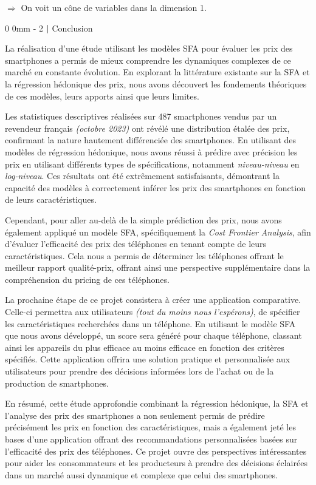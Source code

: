 \documentclass[
  12pt,
]{report}
\makeatletter
\renewcommand{\chapter}{%
    \clearpage %
    \@startsection{chapter}%
    {0} %
    {0mm} %
    {-\baselineskip} %
    {2\baselineskip} %
    {\normalfont\Huge\bfseries | \Huge\bfseries}%
}
\makeatother
\begin{document}
\(\Rightarrow\) On voit un cône de variables dans la dimension 1.

\chapter{Conclusion}\label{conclusion-2}

La réalisation d'une étude utilisant les modèles SFA pour évaluer les
prix des smartphones a permis de mieux comprendre les dynamiques
complexes de ce marché en constante évolution. En explorant la
littérature existante sur la SFA et la régression hédonique des prix,
nous avons découvert les fondements théoriques de ces modèles, leurs
apports ainsi que leurs limites.

Les statistiques descriptives réalisées sur 487 smartphones vendus par
un revendeur français \emph{(octobre 2023)} ont révélé une distribution
étalée des prix, confirmant la nature hautement différenciée des
smartphones. En utilisant des modèles de régression hédonique, nous
avons réussi à prédire avec précision les prix en utilisant différents
types de spécifications, notamment \emph{niveau-niveau} en
\emph{log-niveau}. Ces résultats ont été extrêmement satisfaisants,
démontrant la capacité des modèles à correctement inférer les prix des
smartphones en fonction de leurs caractéristiques.

Cependant, pour aller au-delà de la simple prédiction des prix, nous
avons également appliqué un modèle SFA, spécifiquement la \emph{Cost
Frontier Analysis}, afin d'évaluer l'efficacité des prix des téléphones
en tenant compte de leurs caractéristiques. Cela nous a permis de
déterminer les téléphones offrant le meilleur rapport qualité-prix,
offrant ainsi une perspective supplémentaire dans la compréhension du
pricing de ces téléphones.

La prochaine étape de ce projet consistera à créer une application
comparative. Celle-ci permettra aux utilisateurs \emph{(tout du moins
nous l'espérons)}, de spécifier les caractéristiques recherchées dans un
téléphone. En utilisant le modèle SFA que nous avons développé, un score
sera généré pour chaque téléphone, classant ainsi les appareils du plus
efficace au moins efficace en fonction des critères spécifiés. Cette
application offrira une solution pratique et personnalisée aux
utilisateurs pour prendre des décisions informées lors de l'achat ou de
la production de smartphones.

En résumé, cette étude approfondie combinant la régression hédonique, la
SFA et l'analyse des prix des smartphones a non seulement permis de
prédire précisément les prix en fonction des caractéristiques, mais a
également jeté les bases d'une application offrant des recommandations
personnalisées basées sur l'efficacité des prix des téléphones. Ce
projet ouvre des perspectives intéressantes pour aider les consommateurs
et les producteurs à prendre des décisions éclairées dans un marché
aussi dynamique et complexe que celui des smartphones.
\end{document}
